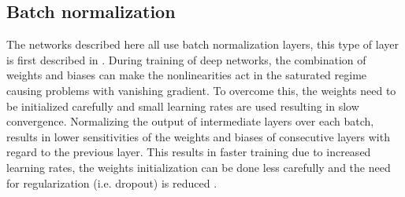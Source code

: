 \subsection{Batch normalization}\label{sec:batch_norm}
The networks described here all use batch normalization layers, this type of layer is first described in \cite{ioffe2015batch}. During training of deep networks, the combination of weights and biases can make the nonlinearities act in the saturated regime causing problems with vanishing gradient. To overcome this, the weights need to be initialized carefully and small learning rates are used resulting in slow convergence. Normalizing the output of intermediate layers over each batch, results in lower sensitivities of the weights and biases of consecutive layers with regard to the previous layer. This results in faster training due to increased learning rates, the weights initialization can be done less carefully and the need for regularization (i.e. dropout) is reduced \cite{ioffe2015batch}. 


